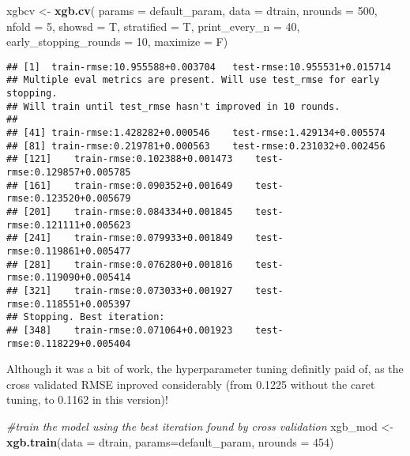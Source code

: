 \documentclass[]{article}
\newenvironment{Shaded}{\begin{snugshade}}{\end{snugshade}}
\newcommand{\KeywordTok}[1]{\textcolor[rgb]{0.13,0.29,0.53}{\textbf{#1}}}
\newcommand{\DataTypeTok}[1]{\textcolor[rgb]{0.13,0.29,0.53}{#1}}
\newcommand{\DecValTok}[1]{\textcolor[rgb]{0.00,0.00,0.81}{#1}}
\newcommand{\StringTok}[1]{\textcolor[rgb]{0.31,0.60,0.02}{#1}}
\newcommand{\CommentTok}[1]{\textcolor[rgb]{0.56,0.35,0.01}{\textit{#1}}}
\newcommand{\NormalTok}[1]{#1}
\begin{document}
\begin{Shaded}
\begin{Highlighting}[]
\NormalTok{xgbcv <-}\StringTok{ }\KeywordTok{xgb.cv}\NormalTok{( }\DataTypeTok{params =}\NormalTok{ default_param, }\DataTypeTok{data =}\NormalTok{ dtrain, }\DataTypeTok{nrounds =} \DecValTok{500}\NormalTok{, }\DataTypeTok{nfold =} \DecValTok{5}\NormalTok{, }\DataTypeTok{showsd =}\NormalTok{ T, }\DataTypeTok{stratified =}\NormalTok{ T, }\DataTypeTok{print_every_n =} \DecValTok{40}\NormalTok{, }\DataTypeTok{early_stopping_rounds =} \DecValTok{10}\NormalTok{, }\DataTypeTok{maximize =}\NormalTok{ F)}
\end{Highlighting}
\end{Shaded}

\begin{verbatim}
## [1]  train-rmse:10.955588+0.003704   test-rmse:10.955531+0.015714 
## Multiple eval metrics are present. Will use test_rmse for early stopping.
## Will train until test_rmse hasn't improved in 10 rounds.
## 
## [41] train-rmse:1.428282+0.000546    test-rmse:1.429134+0.005574 
## [81] train-rmse:0.219781+0.000563    test-rmse:0.231032+0.002456 
## [121]    train-rmse:0.102388+0.001473    test-rmse:0.129857+0.005785 
## [161]    train-rmse:0.090352+0.001649    test-rmse:0.123520+0.005679 
## [201]    train-rmse:0.084334+0.001845    test-rmse:0.121111+0.005623 
## [241]    train-rmse:0.079933+0.001849    test-rmse:0.119861+0.005477 
## [281]    train-rmse:0.076280+0.001816    test-rmse:0.119090+0.005414 
## [321]    train-rmse:0.073033+0.001927    test-rmse:0.118551+0.005397 
## Stopping. Best iteration:
## [348]    train-rmse:0.071064+0.001923    test-rmse:0.118229+0.005404
\end{verbatim}

Although it was a bit of work, the hyperparameter tuning definitly paid
of, as the cross validated RMSE inproved considerably (from 0.1225
without the caret tuning, to 0.1162 in this version)!

\begin{Shaded}
\begin{Highlighting}[]
\CommentTok{#train the model using the best iteration found by cross validation}
\NormalTok{xgb_mod <-}\StringTok{ }\KeywordTok{xgb.train}\NormalTok{(}\DataTypeTok{data =}\NormalTok{ dtrain, }\DataTypeTok{params=}\NormalTok{default_param, }\DataTypeTok{nrounds =} \DecValTok{454}\NormalTok{)}
\end{Highlighting}
\end{Shaded}
\end{document}
